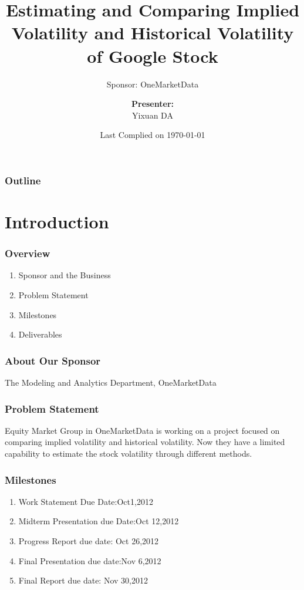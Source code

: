 \documentclass[compress,handout,10pt]{beamer}
\title{{\color{blue} \LARGE Estimating and Comparing Implied Volatility and Historical Volatility of Google Stock\newline} }
\subtitle{{\color{red} \large Sponsor: OneMarketData} }
\author{ 
    {\bf{Presenter:}} \\ 
Yixuan DA \\ 
    \vspace{5pt}
}
\institute{JHU AMS 2012 FALL}
\date{\mygreen Last Complied on \today}
\let\olditem\item
\renewcommand{\item}{\setlength{\itemsep}{0.5\baselineskip}\olditem}
\begin{document}
\begin{frame}[plain]
    \titlepage
\end{frame}

\begin{frame}
    \frametitle{Outline}
    \tableofcontents
\end{frame}

\section{Introduction}
\begin{frame}
    \frametitle{Overview}
    \vspace{7pt}
             \begin{enumerate}
                 \item Sponsor and the Business
                 \item Problem Statement 
                 \item Milestones
                 \item Deliverables
             \end{enumerate}
\end{frame}


\begin{frame}
    \frametitle{About Our Sponsor}
    The Modeling and Analytics Department, OneMarketData
\end{frame}

\begin{frame}
    \frametitle{Problem Statement}
Equity Market Group in OneMarketData is working on a project focused on comparing implied volatility and historical volatility. Now they have a limited capability to estimate the stock volatility through different methods.
\end{frame}

\begin{frame}
    \frametitle{Milestones}
    \begin{enumerate}
        \item Work Statement Due Date:Oct1,2012 
                \item Midterm Presentation due Date:Oct 12,2012
                \item Progress Report due date: Oct 26,2012
                \item Final Presentation due date:Nov 6,2012
                \item Final Report due date: Nov 30,2012
            \end{enumerate}
\end{frame}
\end{document}
